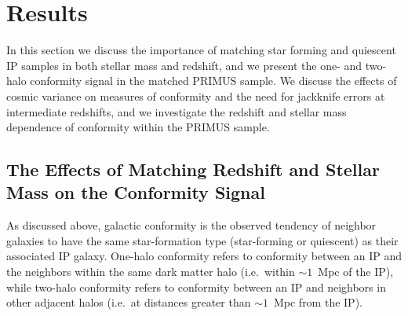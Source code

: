 
\section{Results}\label{sec:results}

In this section we discuss the importance of matching star forming and quiescent IP 
samples in both stellar mass and redshift, and we present the one- and two-halo 
conformity signal in the matched PRIMUS sample.  We discuss the effects of 
cosmic variance on measures of conformity and the need for jackknife
errors at intermediate redshifts, and we investigate the redshift and stellar mass 
dependence of conformity within the PRIMUS sample.

\subsection{The Effects of Matching Redshift and Stellar Mass on the Conformity Signal}\label{sec:LTfraction}

As discussed above, galactic conformity is the observed tendency of neighbor 
galaxies to have the same star-formation type (star-forming or quiescent) 
as their associated IP galaxy.
One-halo conformity refers to conformity between an IP and the neighbors within the 
same dark matter halo (i.e.~within $\sim1$~Mpc of the IP),
while two-halo conformity refers to conformity between an IP and neighbors in other 
adjacent halos (i.e.~at distances greater than $\sim1$~Mpc from the IP).

